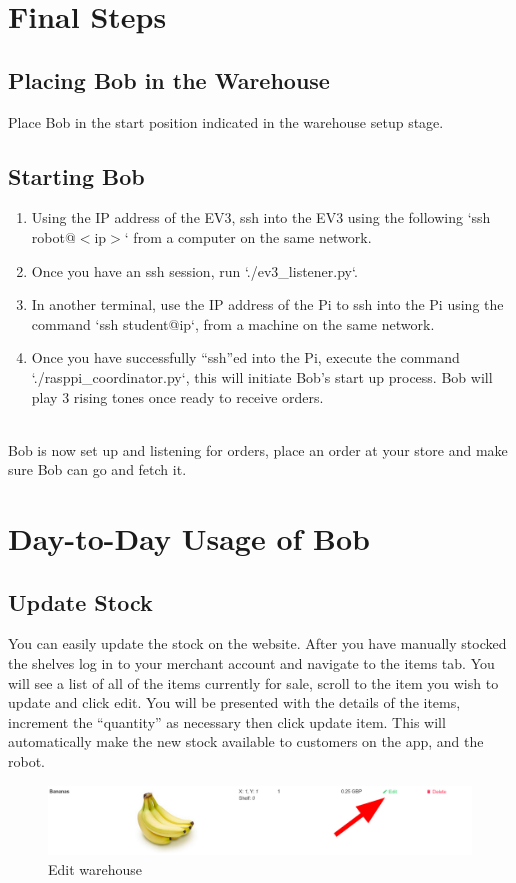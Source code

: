 \documentclass[onecolumn]{IEEEtran}
\begin{document}
\section{Final Steps}
\subsection{Placing Bob in the Warehouse}
Place Bob in the start position indicated in the warehouse setup stage.

\subsection{Starting Bob}
\begin{enumerate}
    \item Using the IP address of the EV3, ssh into the EV3 using the following `ssh robot@$<$ip$>$` from a computer on the same network.
    \item Once you have an ssh session, run `./ev3\_listener.py`.
    \item In another terminal, use the IP address of the Pi to ssh into the Pi using the command `ssh student@ip`, from a machine on the same network.
    \item Once you have successfully “ssh”ed into the Pi, execute the command `./rasppi\_coordinator.py`, this will initiate Bob’s start up process. Bob will play 3 rising tones once ready to receive orders.
\end{enumerate}
\  \\
Bob is now set up and listening for orders, place an order at your store and make sure Bob can go and fetch it.

{\let\clearpage\relax \section{Day-to-Day Usage of Bob}}

\subsection{Update Stock}
You can easily update the stock on the website. After you have manually stocked the shelves log in to your merchant account and navigate to the items tab. You will see a list of all of the items currently for sale, scroll to the item you wish to update and click edit. You will be presented with the details of the items, increment the “quantity” as necessary then click update item. This will automatically make the new stock available to customers on the app, and the robot.
\begin{figure}[H]
    \begin{center}
    \includegraphics[width=1\textwidth]{update_stock.png}
    \caption{Edit warehouse}
    \label{fig: figure}
    \end{center}
\end{figure}
\end{document}
